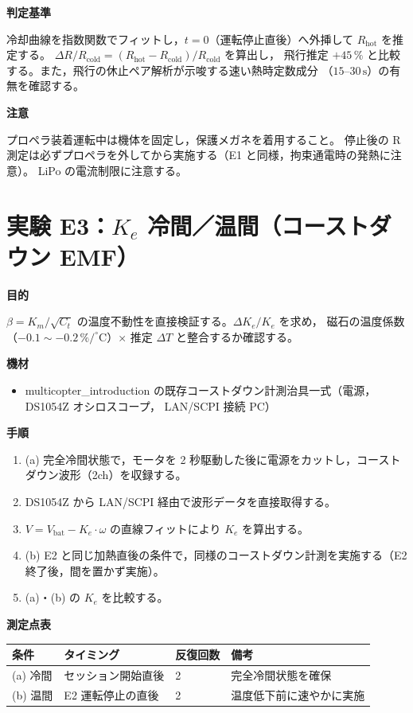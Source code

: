 \documentclass[a4paper,11pt]{ltjsarticle}
\newcommand{\expfield}[1]{\medskip\noindent\textbf{#1}\par\nobreak\smallskip\noindent}
\begin{document}
\expfield{判定基準}
冷却曲線を指数関数でフィットし，$t=0$（運転停止直後）へ外挿して $R_\mathrm{hot}$ を推定する。
$\Delta R / R_\mathrm{cold} = (R_\mathrm{hot} - R_\mathrm{cold}) / R_\mathrm{cold}$ を算出し，
飛行推定 $+45\,\%$ と比較する。また，飛行の休止ペア解析が示唆する速い熱時定数成分
（$15$--$30\,\mathrm{s}$）の有無を確認する。

\expfield{注意}
プロペラ装着運転中は機体を固定し，保護メガネを着用すること。
停止後の R 測定は必ずプロペラを外してから実施する（E1 と同様，拘束通電時の発熱に注意）。
LiPo の電流制限に注意する。

\section{実験 E3：$K_e$ 冷間／温間（コーストダウン EMF）}
\expfield{目的}
$\beta = K_m/\sqrt{C_t}$ の温度不動性を直接検証する。$\Delta K_e / K_e$ を求め，
磁石の温度係数（$-0.1 \sim -0.2\,\%/^\circ\mathrm{C}$）$\times$ 推定 $\Delta T$ と整合するか確認する。

\expfield{機材}
\begin{itemize}
  \item multicopter\_introduction の既存コーストダウン計測治具一式（電源，DS1054Z オシロスコープ，
    LAN/SCPI 接続 PC）
\end{itemize}

\expfield{手順}
\begin{enumerate}
  \item (a) 完全冷間状態で，モータを 2 秒駆動した後に電源をカットし，コーストダウン波形（2ch）を収録する。
  \item DS1054Z から LAN/SCPI 経由で波形データを直接取得する。
  \item $V = V_\mathrm{bat} - K_e \cdot \omega$ の直線フィットにより $K_e$ を算出する。
  \item (b) E2 と同じ加熱直後の条件で，同様のコーストダウン計測を実施する（E2 終了後，間を置かず実施）。
  \item (a)・(b) の $K_e$ を比較する。
\end{enumerate}

\expfield{測定点表}
\begin{center}
\small
\begin{tabular}{@{}llll@{}}
\toprule
条件 & タイミング & 反復回数 & 備考 \\
\midrule
(a) 冷間 & セッション開始直後 & 2 & 完全冷間状態を確保 \\
(b) 温間 & E2 運転停止の直後 & 2 & 温度低下前に速やかに実施 \\
\bottomrule
\end{tabular}
\end{center}
\end{document}
